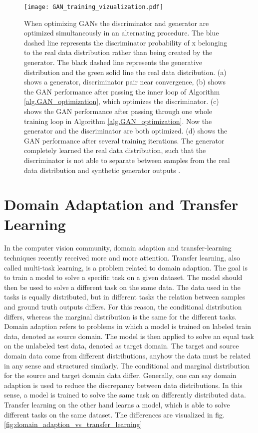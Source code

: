 \begin{figure}[H]
  \centering
  \texttt{[image: GAN\_training\_vizualization.pdf]}
  \caption{When optimizing GANs the discriminator and generator are optimized simultaneously in an alternating procedure. The blue dashed line represents the discriminator probability of x belonging to the real data distribution rather than being created by the generator. The black dashed line represents the generative distribution and the green solid line the real data distribution. (a) shows a generator, discriminator pair near convergence, (b) shows the GAN performance after passing the inner loop of Algorithm \ref{alg.GAN_optimization}, which optimizes the discriminator. (c) shows the GAN performance after passing through one whole training loop in Algorithm \ref{alg.GAN_optimization}. Now the generator and the discriminator are both optimized. (d) shows the GAN performance after several training iterations. The generator completely learned the real data distribution, such that the discriminator is not able to separate between samples from the real data distribution and synthetic generator outputs \cite{Goodfellow2014}.}
  \label{fig:GAN_training_vizualization}
\end{figure}




\section{Domain Adaptation and Transfer Learning}

In the computer vision community, domain adaption and transfer-learning techniques recently received more and more attention. Transfer learning, also called multi-task learning, is a problem related to domain adaption. The goal is to train a model to solve a specific task on a given dataset. The model should then be used to solve a different task on the same data. The data used in the tasks is equally distributed, but in different tasks the relation between samples and ground truth outputs differs. For this reason, the conditional distribution differs, whereas the marginal distribution is the same for the different tasks. Domain adaption refers to problems in which a model is trained on labeled train data, denoted as source domain. The model is then applied to solve an equal task on the unlabeled test data, denoted as target domain. The target and source domain data come from different distributions, anyhow the data must be related in any sense and structured similarly. The conditional and marginal distribution for the source and target domain data differ. Generally, one can say domain adaption is used to reduce the discrepancy between data distributions. In this sense, a model is trained to solve the same task on differently distributed data. Transfer learning on the other hand learns a model, which is able to solve different tasks on the same dataset. The differences are visualized in fig. \ref{fig:domain_adaption_vs_transfer_learning}

